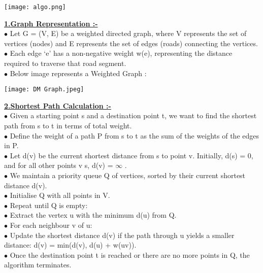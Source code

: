 \documentclass[23pt]{article}
\begin{document}
\begin{center}
\texttt{[image: algo.png]}
\end{center}
\hypertarget{target:Graph Representation}{}

\item \textbf{\huge\underline{1.Graph Representation :-}} 
\\
\Large
   $\bullet$ Let G = (V, E) be a weighted directed graph, where V represents the set of vertices (nodes) 	and E represents the set of edges (roads) connecting the vertices.\\
   $\bullet$ Each edge ‘e’ has a non-negative weight w(e), representing the distance required to traverse that road  segment.\\
    $\bullet$ Below image represents a Weighted Graph : \cite{graphtheory}\\
    \begin{center}
\texttt{[image: DM Graph.jpeg]} 
\end{center}
\hypertarget{target:Shortest Path Calculation}{}

\item \textbf{\huge\underline{2.Shortest Path Calculation :-}}  \\
\Large
   $\bullet$ Given a starting point s and a destination point t, we want to find the shortest path from s to t in terms of total weight.\\
   $\bullet$ Define the weight of a path P from s to t as the sum of the weights of the edges in P.\\
   $\bullet$ Let d(v) be the current shortest distance from s to point v. Initially, d(s) = 0, and for all other 	points v \neq s, d(v) = $\infty$ . \\
   $\bullet$ We maintain a priority queue Q of vertices, sorted by their current shortest distance d(v).\\
   $\bullet$ Initialise Q with all points in V.\\
   $\bullet$ Repeat until Q is empty:\\
   $\bullet$ Extract the vertex u with the minimum d(u) from Q.\\
   $\bullet$ For each neighbour v of u:\\
   $\bullet$ Update the shortest distance d(v) if the path through u yields a smaller distance: d(v) = 		min(d(v), d(u) + w(uv)).\\
   $\bullet$ Once the destination point t is reached or there are no more points in Q, the algorithm 	terminates.\\
\end{document}
